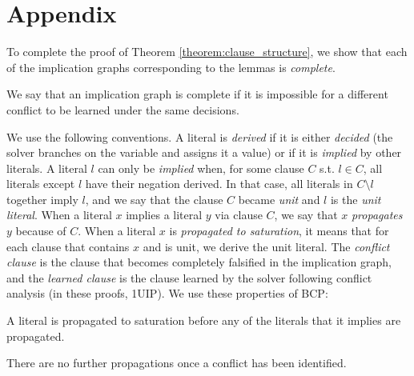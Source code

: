 \documentclass[a4paper,UKenglish,cleveref, autoref, thm-restate]{lipics-v2021}
\begin{document}
\newpage 

 

\newpage

\section{Appendix}
To complete the proof of Theorem \ref{theorem:clause_structure}, we show that each of the implication graphs corresponding to the lemmas is \textit{complete}.

\begin{definition}[\bf Completeness]
We say that an implication graph is complete if it is impossible for a different conflict to be learned under the same decisions. 
\end{definition}

We use the following conventions. A literal is \textit{derived} if it is either \textit{decided} (the solver branches on the variable and assigns it a value) or if it is \textit{implied} by other literals. A literal $l$ can only be \textit{implied} when, for some clause $C$ s.t. $l \in C$, all literals except $l$ have their negation derived. In that case, all literals in $C \setminus l$ together imply $l$, and we say that the clause $C$ became \textit{unit} and $l$ is the \textit{unit literal}. When a literal $x$ implies a literal $y$ via clause $C$, we say that $x$ \textit{propagates} $y$ because of $C$. When a literal $x$ is \textit{propagated to saturation}, it means that for each clause that contains $x$ and is unit, we derive the unit literal. The \textit{conflict clause} is the clause that becomes completely falsified in the implication graph, and the \textit{learned clause} is the clause learned by the solver following conflict analysis (in these proofs, 1UIP). We use these properties of BCP:

\begin{observation} 
A literal is propagated to saturation before any of the literals that it implies are propagated.
\end{observation}

\begin{observation}
There are no further propagations once a conflict has been identified. 
\end{observation}
\end{document}
